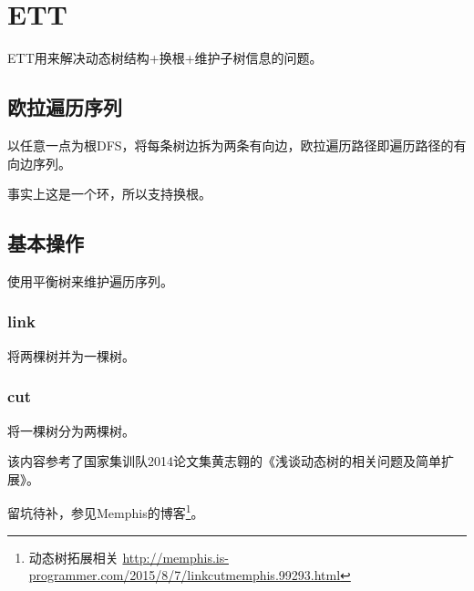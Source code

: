 \section{ETT}

ETT用来解决动态树结构+换根+维护子树信息的问题。
\subsection{欧拉遍历序列}
以任意一点为根DFS，将每条树边拆为两条有向边，欧拉遍历路径即遍历路径的有向边序列。

事实上这是一个环，所以支持换根。
\subsection{基本操作}
使用平衡树来维护遍历序列。
\subsubsection{link}
将两棵树并为一棵树。
\subsubsection{cut}
将一棵树分为两棵树。

该内容参考了国家集训队2014论文集黄志翱的《浅谈动态树的相关问题及简单扩展》。

留坑待补，参见Memphis的博客\footnote{
    动态树拓展相关
    \url{http://memphis.is-programmer.com/2015/8/7/linkcutmemphis.99293.html}
}。
